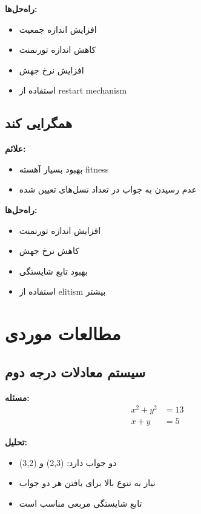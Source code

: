 \documentclass[12pt,a4paper]{article}
\begin{document}
			\textbf{راه‌حل‌ها:}
			\begin{itemize}
				\item افزایش اندازه جمعیت
				\item کاهش اندازه تورنمنت
				\item افزایش نرخ جهش
				\item استفاده از restart mechanism
			\end{itemize}
			
			\subsection{همگرایی کند}
			
			\textbf{علائم:}
			\begin{itemize}
				\item بهبود بسیار آهسته fitness
				\item عدم رسیدن به جواب در تعداد نسل‌های تعیین شده
			\end{itemize}
			
			\textbf{راه‌حل‌ها:}
			\begin{itemize}
				\item افزایش اندازه تورنمنت
				\item کاهش نرخ جهش
				\item بهبود تابع شایستگی
				\item استفاده از elitism بیشتر
			\end{itemize}
			
			\section{مطالعات موردی}
			
			\subsection{سیستم معادلات درجه دوم}
			
			\textbf{مسئله:}
			\begin{align}
				x^2 + y^2 &= 13 \\
				x + y &= 5
			\end{align}
			
			\textbf{تحلیل:}
			\begin{itemize}
				\item دو جواب دارد: (2,3) و (3,2)
				\item نیاز به تنوع بالا برای یافتن هر دو جواب
				\item تابع شایستگی مربعی مناسب است
			\end{itemize}
			
\end{document}

